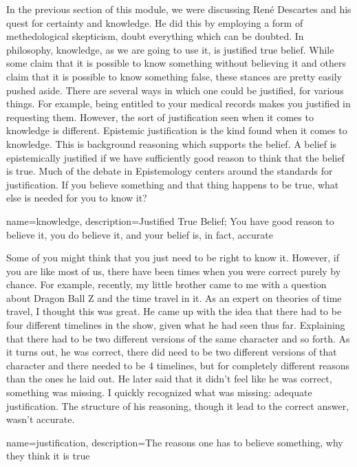 In the previous section of this module, we were discussing Ren\'e Descartes and his quest for certainty and knowledge. He did this by employing a form of methedological skepticism, doubt everything which can be doubted. In philosophy, \gls{knowledge}, as we are going to use it, is justified true belief. While some claim that it is possible to know something without believing it and others claim that it is possible to know something false, these stances are pretty easily pushed aside. There are several ways in which one could be justified, for various things. For example, being entitled to your medical records makes you justified in requesting them. However, the sort of justification seen when it comes to knowledge is different. Epistemic justification is the kind found when it comes to knowledge. This is background reasoning which supports the belief. A belief is epistemically justified if we have sufficiently good reason to think that the belief is true. Much of the debate in Epistemology centers around the standards for justification. If you believe something and that thing happens to be true, what else is needed for you to know it?

{
name=knowledge,
description={Justified True Belief; You have good reason to believe it, you do believe it, and your belief is, in fact, accurate}
}


Some of you might think that you just need to be right to know it. However, if you are like most of us, there have been times when you were correct purely by chance. For example, recently, my little brother came to me with a question about Dragon Ball Z and the time travel in it. As an expert on theories of time travel, I thought this was great. He came up with the idea that there had to be four different timelines in the show, given what he had seen thus far. Explaining that there had to be two different versions of the same character and so forth. As it turns out, he was correct, there did need to be two different versions of that character and there needed to be 4 timelines, but for completely different reasons than the ones he laid out. He later said that it didn't feel like he was correct, something was missing. I quickly recognized what was missing: adequate \gls{justification}. The structure of his reasoning, though it lead to the correct answer, wasn't accurate.

{
name=justification,
description={The reasons one has to believe something, why they think it is true}
}


